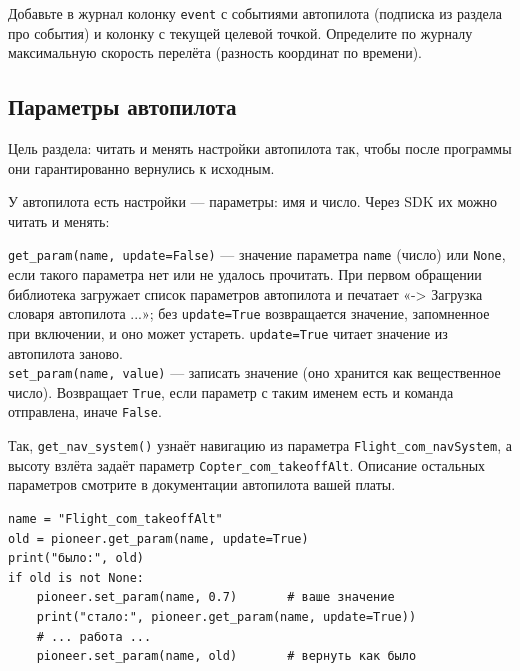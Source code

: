 \begin{taskbox}
Добавьте в журнал колонку \texttt{event} с событиями автопилота (подписка из раздела про события) и колонку с текущей целевой точкой. Определите по журналу максимальную скорость перелёта (разность координат по времени).
\end{taskbox}

\subsection{Параметры автопилота}

Цель раздела: читать и менять настройки автопилота так, чтобы после программы они гарантированно вернулись к исходным.

У автопилота есть настройки --- параметры: имя и число. Через SDK их можно читать и менять:

\begin{codebox}
\verb|get_param(name, update=False)| --- значение параметра \verb|name| (число) или \verb|None|, если такого параметра нет или не удалось прочитать. При первом обращении библиотека загружает список параметров автопилота и печатает «-> Загрузка словаря автопилота ...»; без \verb|update=True| возвращается значение, запомненное при включении, и оно может устареть. \verb|update=True| читает значение из автопилота заново.\\
\verb|set_param(name, value)| --- записать значение (оно хранится как вещественное число). Возвращает \verb|True|, если параметр с таким именем есть и команда отправлена, иначе \verb|False|.
\end{codebox}

Так, \verb|get_nav_system()| узнаёт навигацию из параметра \texttt{Flight\_com\_navSystem}, а высоту взлёта задаёт параметр \texttt{Copter\_com\_takeoffAlt}. Описание остальных параметров смотрите в документации автопилота вашей платы.

\begin{codebox}
\small
\begin{verbatim}
name = "Flight_com_takeoffAlt"
old = pioneer.get_param(name, update=True)
print("было:", old)
if old is not None:
    pioneer.set_param(name, 0.7)       # ваше значение
    print("стало:", pioneer.get_param(name, update=True))
    # ... работа ...
    pioneer.set_param(name, old)       # вернуть как было
\end{verbatim}
\end{codebox}

